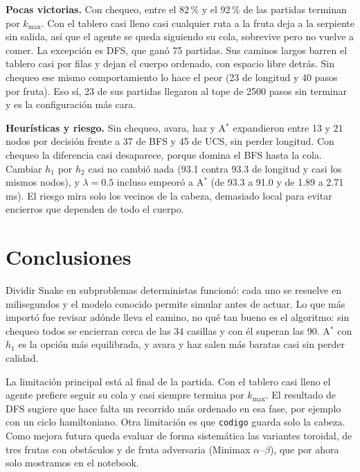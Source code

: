 \documentclass[11pt,letterpaper]{article}
\begin{document}
\textbf{Pocas victorias.} Con chequeo, entre el 82\,\% y el 92\,\% de las partidas terminan por $k_{\max}$. Con el tablero casi lleno casi cualquier ruta a la fruta deja a la serpiente sin salida, así que el agente se queda siguiendo su cola, sobrevive pero no vuelve a comer. La excepción es DFS, que ganó 75 partidas. Sus caminos largos barren el tablero casi por filas y dejan el cuerpo ordenado, con espacio libre detrás. Sin chequeo ese mismo comportamiento lo hace el peor (23 de longitud y 40 pasos por fruta). Eso sí, 23 de sus partidas llegaron al tope de 2500 pasos sin terminar y es la configuración más cara.

\textbf{Heurísticas y riesgo.} Sin chequeo, avara, haz y A$^*$ expandieron entre 13 y 21 nodos por decisión frente a 37 de BFS y 45 de UCS, sin perder longitud. Con chequeo la diferencia casi desaparece, porque domina el BFS hasta la cola. Cambiar $h_1$ por $h_2$ casi no cambió nada (93.1 contra 93.3 de longitud y casi los mismos nodos), y $\lambda=0.5$ incluso empeoró a A$^*$ (de 93.3 a 91.0 y de 1.89 a 2.71 ms). El riesgo mira solo los vecinos de la cabeza, demasiado local para evitar encierros que dependen de todo el cuerpo.

\section{Conclusiones}

Dividir Snake en subproblemas deterministas funcionó: cada uno se resuelve en milisegundos y el modelo conocido permite simular antes de actuar. Lo que más importó fue revisar adónde lleva el camino, no qué tan bueno es el algoritmo: sin chequeo todos se encierran cerca de las 34 casillas y con él superan las 90. A$^*$ con $h_1$ es la opción más equilibrada, y avara y haz salen más baratas casi sin perder calidad.

La limitación principal está al final de la partida. Con el tablero casi lleno el agente prefiere seguir su cola y casi siempre termina por $k_{\max}$. El resultado de DFS sugiere que hace falta un recorrido más ordenado en esa fase, por ejemplo con un ciclo hamiltoniano. Otra limitación es que \texttt{codigo} guarda solo la cabeza. Como mejora futura queda evaluar de forma sistemática las variantes toroidal, de tres frutas con obstáculos y de fruta adversaria (Minimax $\alpha$--$\beta$), que por ahora solo mostramos en el notebook.

\end{document}
